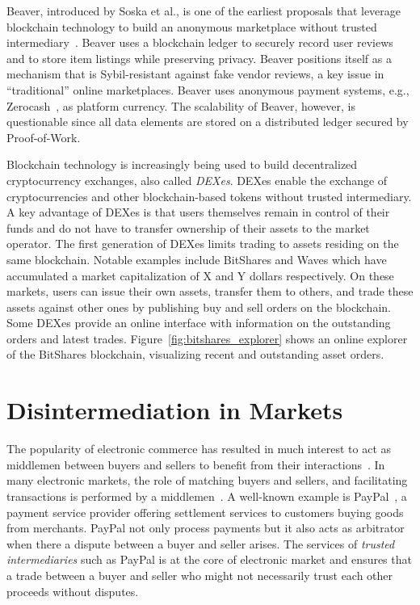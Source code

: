 Beaver, introduced by Soska et al., is one of the earliest proposals that leverage blockchain technology to build an anonymous marketplace without trusted intermediary~\cite{soska2016beaver}.
Beaver uses a blockchain ledger to securely record user reviews and to store item listings while preserving privacy.
Beaver positions itself as a mechanism that is Sybil-resistant against fake vendor reviews, a key issue in \enquote{traditional} online marketplaces.
Beaver uses anonymous payment systems, e.g., Zerocash~\cite{sasson2014zerocash}, as platform currency.
The scalability of Beaver, however, is questionable since all data elements are stored on a distributed ledger secured by Proof-of-Work.

Blockchain technology is increasingly being used to build decentralized cryptocurrency exchanges, also called \emph{DEXes}.
DEXes enable the exchange of cryptocurrencies and other blockchain-based tokens without trusted intermediary.
A key advantage of DEXes is that users themselves remain in control of their funds and do not have to transfer ownership of their assets to the market operator.
The first generation of DEXes limits trading to assets residing on the same blockchain.
Notable examples include BitShares and Waves which have accumulated a market capitalization of X and Y dollars respectively.
On these markets, users can issue their own assets, transfer them to others, and trade these assets against other ones by publishing buy and sell orders on the blockchain.
Some DEXes provide an online interface with information on the outstanding orders and latest trades.
Figure~\ref{fig:bitshares_explorer} shows an online explorer of the BitShares blockchain, visualizing recent and outstanding asset orders.

\section{Disintermediation in Markets}
The popularity of electronic commerce has resulted in much interest to act as middlemen between buyers and sellers to benefit from their interactions~\cite{clark1999electronic}.
In many electronic markets, the role of matching buyers and sellers, and facilitating transactions is performed by a middlemen~\cite{bakos1998emerging}.
A well-known example is PayPal~\cite{paypal}, a payment service provider offering settlement services to customers buying goods from merchants.
PayPal not only process payments but it also acts as arbitrator when there a dispute between a buyer and seller arises.
The services of \emph{trusted intermediaries} such as PayPal is at the core of electronic market and ensures that a trade between a buyer and seller who might not necessarily trust each other proceeds without disputes.

